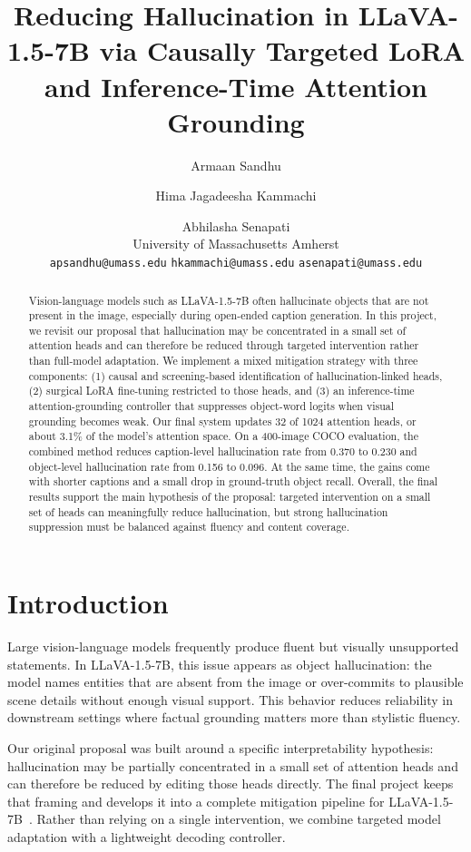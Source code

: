 \documentclass[10pt,twocolumn]{article}
\title{\textbf{Reducing Hallucination in LLaVA-1.5-7B via Causally Targeted LoRA and Inference-Time Attention Grounding}}
\author{
Armaan Sandhu \and
Hima Jagadeesha Kammachi \and
Abhilasha Senapati
\\
\small University of Massachusetts Amherst
\\
\small \texttt{apsandhu@umass.edu}
\quad
\small \texttt{hkammachi@umass.edu}
\quad
\small \texttt{asenapati@umass.edu}
}
\date{}
\begin{document}
\maketitle

\begin{abstract}
Vision-language models such as LLaVA-1.5-7B often hallucinate objects that are not present in the image, especially during open-ended caption generation. In this project, we revisit our proposal that hallucination may be concentrated in a small set of attention heads and can therefore be reduced through targeted intervention rather than full-model adaptation. We implement a mixed mitigation strategy with three components: (1) causal and screening-based identification of hallucination-linked heads, (2) surgical LoRA fine-tuning restricted to those heads, and (3) an inference-time attention-grounding controller that suppresses object-word logits when visual grounding becomes weak. Our final system updates 32 of 1024 attention heads, or about 3.1\% of the model's attention space. On a 400-image COCO evaluation, the combined method reduces caption-level hallucination rate from 0.370 to 0.230 and object-level hallucination rate from 0.156 to 0.096. At the same time, the gains come with shorter captions and a small drop in ground-truth object recall. Overall, the final results support the main hypothesis of the proposal: targeted intervention on a small set of heads can meaningfully reduce hallucination, but strong hallucination suppression must be balanced against fluency and content coverage.
\end{abstract}

\section{Introduction}
Large vision-language models frequently produce fluent but visually unsupported statements. In LLaVA-1.5-7B, this issue appears as object hallucination: the model names entities that are absent from the image or over-commits to plausible scene details without enough visual support. This behavior reduces reliability in downstream settings where factual grounding matters more than stylistic fluency.

Our original proposal was built around a specific interpretability hypothesis: hallucination may be partially concentrated in a small set of attention heads and can therefore be reduced by editing those heads directly. The final project keeps that framing and develops it into a complete mitigation pipeline for LLaVA-1.5-7B~\cite{liu2024llava}. Rather than relying on a single intervention, we combine targeted model adaptation with a lightweight decoding controller.
\end{document}
